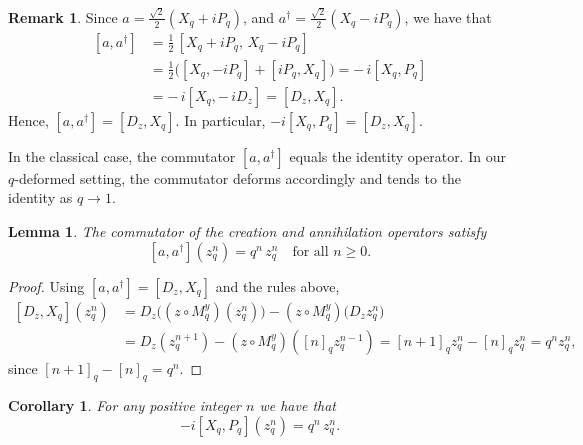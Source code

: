 \documentclass[10pt]{amsart}
\theoremstyle{plain}
\newtheorem{corollary}[theorem]{Corollary}
\newtheorem{lemma}[theorem]{Lemma}
\theoremstyle{definition}
\newtheorem{remark}[theorem]{Remark}
\def\ge{\geqslant}
\begin{document}
\begin{remark}
Since
$
a=\tfrac{\sqrt2}{2}(X_q+iP_q)$, and $a^\dagger=\tfrac{\sqrt2}{2}(X_q-iP_q)
$,
we have that
\[
\begin{aligned}
[a,a^\dagger]
&=\tfrac12\,[X_q+iP_q,\,X_q-iP_q]\\
&=\tfrac12\big([X_q,-iP_q]+[iP_q,X_q]\big)
= -\,i[X_q,P_q]\\
&= -\,i[X_q,-\,iD_z]
= [D_z,X_q].
\end{aligned}
\]
Hence, $[a,a^\dagger]=[D_z,X_q]$. In particular,
$-i[X_q,P_q]=[D_z,X_q]$.
\end{remark}

In the classical case, the commutator $ [a, a^{\dagger}] $ equals the identity operator. In our $q$-deformed setting, the commutator deforms accordingly and tends to the identity as $ q \to 1 $.

\begin{lemma}
The commutator of the creation and annihilation operators satisfy
\[
[a,a^\dagger](z_q^n)= q^n\,z_q^n \quad\text{for all }n\ge0.
\]
\end{lemma}

\begin{proof}
Using $[a,a^\dagger]=[D_z,X_q]$ and the rules above,
\[
\begin{aligned}
[D_z,X_q](z_q^n)
&= D_z\big((z\circ M_q^y)(z_q^n)\big) - (z\circ M_q^y)\big(D_z z_q^n\big) \\
&= D_z(z_q^{n+1}) - (z\circ M_q^y)([n]_q z_q^{n-1})
= [n+1]_q z_q^{n} - [n]_q z_q^{n}
= q^n z_q^{n},
\end{aligned}
\]
since $[n+1]_q-[n]_q=q^n$. 
\end{proof}


\begin{corollary}
For any positive integer $n$ we have that
\[
-i[X_q,P_q](z_q^n)=q^n\,z_q^n.
\]
\end{corollary}
\end{document}
